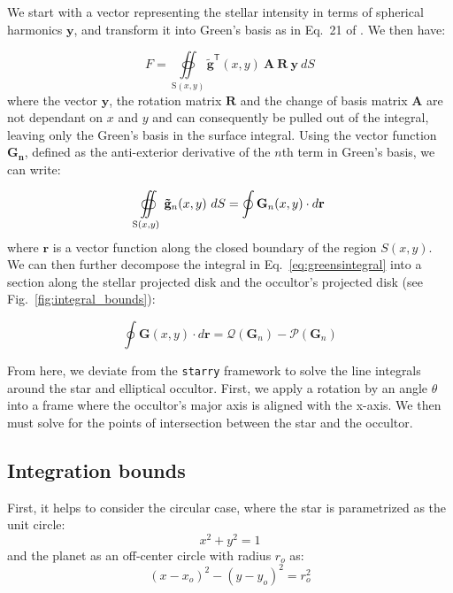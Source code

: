 \documentclass[twocolumn]{aastex631}
\begin{document}
We start with a vector representing the stellar intensity in terms of spherical harmonics $\mathbf{y}$, and transform it into Green's basis as in Eq.~21 of \citet{starry2019}. We then have: 

\begin{equation}
   F = \oiint\limits_{\mathrm{S}(x,y)} \mathbf{\tilde{g}}^\mathsf{T}(x,y) \ \mathbf{A}\ \mathbf{R}\ \mathbf{y}\ dS 
\end{equation}
where the vector $\mathbf{y}$, the rotation matrix $\mathbf{R}$ and the change of basis matrix $\mathbf{A}$ are not dependant on $x$ and $y$ and can consequently be pulled out of the integral, leaving only the Green's basis in the surface integral. Using the vector function $\mathbf{G_n}$, defined as the anti-exterior derivative of the $n$th term in Green's basis, we can write:

\begin{equation} \label{eq:greensintegral}
   \oiint\limits_{\mathrm{S}(x,y)} \mathbf{\tilde{g}}_n(x,y)\ dS \\
   = \oint \mathbf{G}_n(x,y) \cdot d\mathbf{r}
\end{equation}
where $\mathbf{r}$ is a vector function along the closed boundary of the region $S(x,y)$. We can then further decompose the integral in Eq.~\ref{eq:greensintegral} into a section along the stellar projected disk and the occultor's projected disk (see Fig.~\ref{fig:integral_bounds}):

\begin{equation} \label{eq:pandq}
    \oint \mathbf{G}(x,y) \cdot d\mathbf{r} = \mathcal{Q}(\mathbf{G}_n) - \mathcal{P}(\mathbf{G}_n)
\end{equation}

From here, we deviate from the \texttt{starry} framework to solve the line integrals around the star and elliptical occultor. First, we apply a rotation by an angle $\theta$ into a frame where the occultor's major axis is aligned with the x-axis. We then must solve for the points of intersection between the star and the occultor. 

\subsection{Integration bounds}
First, it helps to consider the circular case, where the star is parametrized as the unit circle:
\begin{equation} \label{eq:unitcircle}
x^2 + y^2 = 1
\end{equation}
and the planet as an off-center circle with radius $r_{o}$ as:
\begin{equation} \label{eq:circularplanet}
(x-x_o)^2-(y-y_o)^2 = r_o^2
\end{equation}
\end{document}
